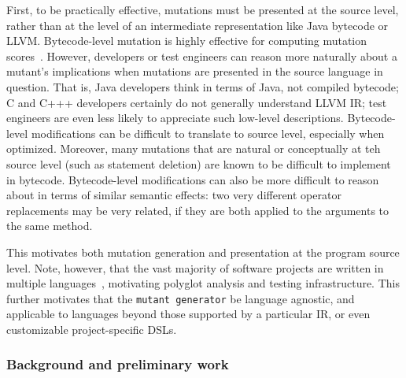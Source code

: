 First, to be practically effective, mutations must be presented at the source
level, rather than at the level of an intermediate representation like Java
bytecode or LLVM.  Bytecode-level mutation is highly effective for computing
mutation scores~\cite{pittest,HaririLLVM}.  However, developers or test
engineers can reason more naturally about a mutant's implications when mutations
are presented in the source language in question.  That is, Java developers
think in terms of Java, not compiled bytecode; C and C+++ developers certainly
do not generally understand LLVM IR; test engineers are even less likely to
appreciate such low-level descriptions.  Bytecode-level modifications can be
difficult to translate to source level, especially when optimized.  Moreover,
many mutations that are natural or conceptually at teh source level (such as
statement deletion) are known to be difficult to implement in bytecode.
Bytecode-level modifications can also be more difficult to reason about in terms
of similar semantic effects: two very different operator replacements may be
very related, if they are both applied to the arguments to the same method. 

This motivates both mutation generation and presentation at the program source
level.  Note, however, that the vast majority of software projects are written
in multiple languages~\cite{Ray2014}, motivating polyglot analysis and testing
infrastructure.  This further motivates that the {\tt mutant generator} be
language agnostic, and applicable to languages beyond those supported by a
particular IR, or even customizable project-specific DSLs.


\subsubsection{Background and preliminary work}

